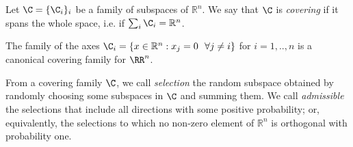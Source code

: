 \begin{definition}\label{def:cov}
Let $\C = \{ \C_i \}_i$ be a family of subspaces of $\mathbb{R}^n$. We say that $\C$ is \emph{covering} if it spans the whole space, i.e. if $\sum_i \C_i = \mathbb{R}^n$.
\end{definition}

\begin{example}\label{ex:axes}%
The family of the axes $\C_i = \{x\in\mathbb{R}^n  : x_j = 0 ~~ \forall j \neq i \}$ for $i=1,..,n$ is a canonical covering family for $\RR^n$. %
\hfill
\end{example}

{From a covering family $\C$, we call \emph{selection} the random subspace obtained by randomly choosing some subspaces in $\C$ and summing them. We call \emph{admissible} the selections that include all directions with some positive probability; or, equivalently, the selections to which no non-zero element of $\mathbb{R}^n$ is orthogonal with probability one.}


